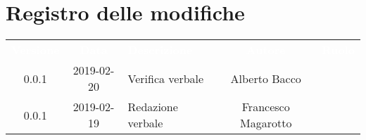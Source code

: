 \section*{Registro delle modifiche}
{
	\renewcommand{\arraystretch}{1.5}
	\centering
	\begin{longtable}{ c c  C{4cm}  c  c }
		
		\textcolor{white}{\textbf{Versione}} & \textcolor{white}{\textbf{Data}} & \textcolor{white}{\textbf{Descrizione}} & \textcolor{white}{\textbf{Autore}} & \textcolor{white}{\textbf{Ruolo}}\\
		
		0.0.1 & 2019-02-20 & Verifica verbale & Alberto Bacco & \ver{}\\
		0.0.1 & 2019-02-19 & Redazione verbale & Francesco Magarotto & \reda{}\\
		
		
	\end{longtable}
	
}